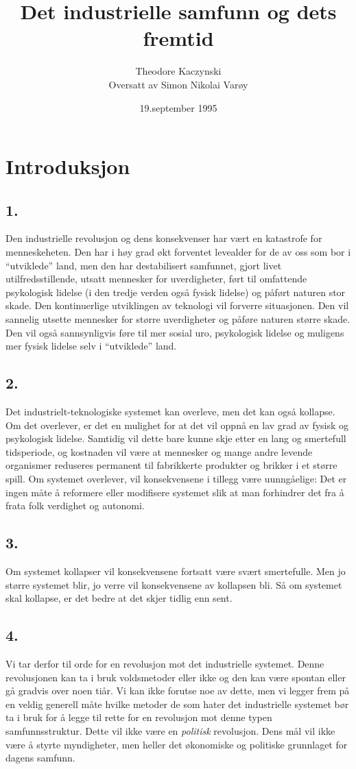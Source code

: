 \documentclass[oneside]{book}
\title{Det industrielle samfunn og dets fremtid}
\author{Theodore Kaczynski\\Oversatt av Simon Nikolai Varøy}
\date{19.september 1995}
\begin{document}
\maketitle
\doclicenseThis
\tableofcontents

\chapter{Introduksjon}
\section*{1.}
Den industrielle revolusjon og dens konsekvenser har vært en katastrofe for
menneskeheten. Den har i høy grad økt forventet levealder for de av oss som bor
i ``utviklede'' land, men den har destabilisert samfunnet, gjort livet
utilfredsstillende, utsatt mennesker for uverdigheter, ført til omfattende
psykologisk lidelse (i den tredje verden også fysisk lidelse) og påført naturen
stor skade. Den kontinuerlige utviklingen av teknologi vil forverre
situasjonen. Den vil sannelig utsette mennesker for større uverdigheter og
påføre naturen større skade. Den vil også sannsynligvis føre til mer sosial
uro, psykologisk lidelse og muligens mer fysisk lidelse selv i ``utviklede''
land.

\section*{2.}
Det industrielt-teknologiske systemet kan overleve, men det kan også kollapse.
Om det overlever, er det en mulighet for at det vil oppnå en lav grad av fysisk
og psykologisk lidelse. Samtidig vil dette bare kunne skje etter en lang og
smertefull tidsperiode, og kostnaden vil være at mennesker og mange andre
levende organismer reduseres permanent til fabrikkerte produkter og brikker i
et større spill. Om systemet overlever, vil konsekvensene i tillegg være
uunngåelige: Det er ingen måte å reformere eller modifisere systemet slik at
man forhindrer det fra å frata folk verdighet og autonomi.

\section*{3.}
Om systemet kollapser vil konsekvensene fortsatt være svært smertefulle. Men jo
større systemet blir, jo verre vil konsekvensene av kollapsen bli. Så om
systemet skal kollapse, er det bedre at det skjer tidlig enn sent.

\section*{4.}
Vi tar derfor til orde for en revolusjon mot det industrielle systemet. Denne
revolusjonen kan ta i bruk voldsmetoder eller ikke og den kan være spontan
eller gå gradvis over noen tiår. Vi kan ikke forutse noe av dette, men vi
legger frem på en veldig generell måte hvilke metoder de som hater det
industrielle systemet bør ta i bruk for å legge til rette for en revolusjon mot
denne typen samfunnsstruktur. Dette vil ikke være en {\em politisk} revolusjon.
Dens mål vil ikke være å styrte myndigheter, men heller det økonomiske og
politiske grunnlaget for dagens samfunn.
\end{document}
